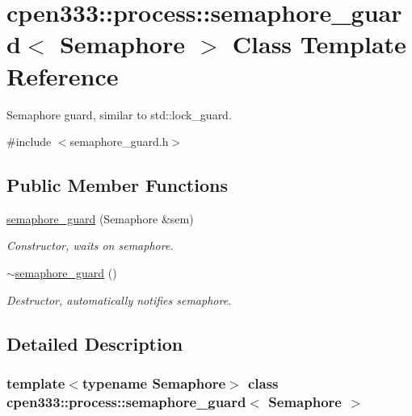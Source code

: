 \hypertarget{classcpen333_1_1process_1_1semaphore__guard}{}\section{cpen333\+:\+:process\+:\+:semaphore\+\_\+guard$<$ Semaphore $>$ Class Template Reference}
\label{classcpen333_1_1process_1_1semaphore__guard}


Semaphore guard, similar to std\+::lock\+\_\+guard.  




{\ttfamily \#include $<$semaphore\+\_\+guard.\+h$>$}

\subsection*{Public Member Functions}
\begin{DoxyCompactItemize}
\item 
\hyperlink{classcpen333_1_1process_1_1semaphore__guard_aa816ac26e4894b1945724944e7965968}{semaphore\+\_\+guard} (Semaphore \&sem)
\begin{DoxyCompactList}\small\item\em Constructor, waits on semaphore. \end{DoxyCompactList}\item 
\mbox{\label{classcpen333_1_1process_1_1semaphore__guard_a878eb8302eb619c83dc83d8995987fd1}} 
\hyperlink{classcpen333_1_1process_1_1semaphore__guard_a878eb8302eb619c83dc83d8995987fd1}{$\sim$semaphore\+\_\+guard} ()
\begin{DoxyCompactList}\small\item\em Destructor, automatically notifies semaphore. \end{DoxyCompactList}\end{DoxyCompactItemize}


\subsection{Detailed Description}
\subsubsection*{template$<$typename Semaphore$>$\newline
class cpen333\+::process\+::semaphore\+\_\+guard$<$ Semaphore $>$}

